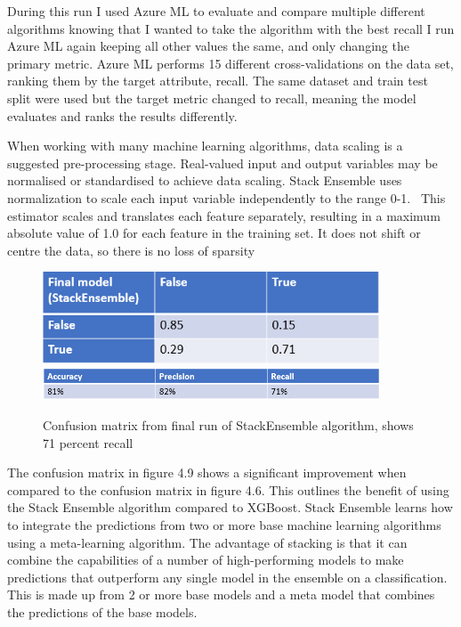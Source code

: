 During this run I used Azure ML to evaluate and compare multiple different algorithms knowing that I wanted to take the algorithm with the best recall I run Azure ML again keeping all other values the same, and only changing the primary metric. Azure ML performs 15 different cross-validations on the data set, ranking them by the target attribute, recall. The same dataset and train test split were used but the target metric changed to recall,  meaning the model evaluates and ranks the results differently.

When working with many machine learning algorithms, data scaling is a suggested pre-processing stage. Real-valued input and output variables may be normalised or standardised to achieve data scaling. Stack Ensemble uses normalization  to scale each input variable independently to the range 0-1.  This estimator scales and translates each feature separately, resulting in a maximum absolute value of 1.0 for each feature in the training set. It does not shift or centre the data, so there is no loss of sparsity \cite{Singh2019MLlib:Library,Sklearn.preprocessing.MaxAbsScalerDocumentation}



\begin{figure}[H]
 \includegraphics[width=10cm]{figures/azure_ml_confusion_matrix.png}
 \includegraphics[width=10cm]{figures/final_recall.png}
 \caption{Confusion matrix from final run of StackEnsemble algorithm, shows 71 percent recall}
\end{figure}
The confusion matrix in figure 4.9 shows a significant improvement when compared to the confusion matrix in figure 4.6. This outlines the benefit of using the Stack Ensemble algorithm compared to XGBoost. Stack Ensemble learns how to integrate the predictions from two or more base machine learning algorithms using a meta-learning algorithm. The advantage of stacking is that it can combine the capabilities of a number of high-performing models to make predictions that outperform any single model in the ensemble on a classification. This is made up from 2 or more base models and a meta model that combines the predictions of the base models.

